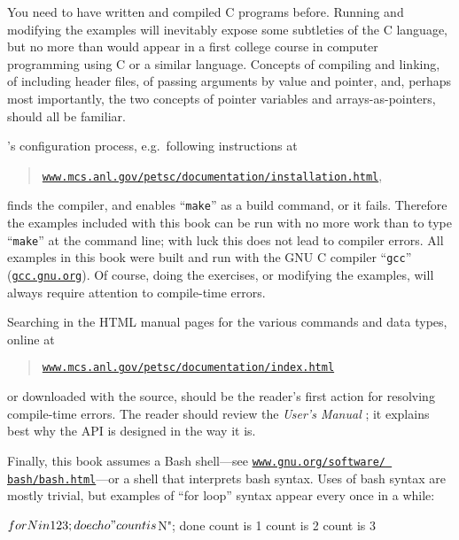 You need to have written and compiled C programs before.   Running and modifying the examples will inevitably expose some subtleties of the C language, but no more than would appear in a first college course in computer programming using C or a similar language.  Concepts of compiling and linking, of including header files, of passing arguments by value and pointer, and, perhaps most importantly, the two concepts of pointer variables and arrays-as-pointers, should all be familiar.

\PETSc's configuration process, e.g.~following instructions at
\begin{quote}
\href{http://www.mcs.anl.gov/petsc/documentation/installation.html}{\texttt{www.mcs.anl.gov/petsc/documentation/installation.html}},
\end{quote}
finds the compiler, and enables ``\texttt{make}'' as a build command, or it fails.  Therefore the examples included with this book can be run with no more work than to type ``\texttt{make}'' at the command line; with luck this does not lead to compiler errors.  All examples in this book were built and run with the GNU C compiler ``\texttt{gcc}'' (\href{https://gcc.gnu.org/}{\texttt{gcc.gnu.org}}).  Of course, doing the exercises, or modifying the examples, will always require attention to compile-time errors.

Searching in the \PETSc HTML manual pages for the various commands and data types, online at
\begin{quote}
\href{http://www.mcs.anl.gov/petsc/documentation/index.html}{\texttt{www.mcs.anl.gov/petsc/documentation/index.html}}
\end{quote}
or downloaded with the \PETSc source, should be the reader's first action for resolving compile-time errors.  The reader should review the \emph{\PETSc User's Manual} \citep{petsc-user-ref}; it explains best why the API is designed in the way it is.

Finally, this book assumes a Bash shell---see  \href{https://www.gnu.org/software/bash/bash.html}{\texttt{www.gnu.org/software/ bash/bash.html}}---or a shell that interprets bash syntax.  Uses of bash syntax are mostly trivial, but examples of ``for loop'' syntax appear every once in a while:
\begin{cline}
$ for N in 1 2 3; do echo "count is $N"; done
count is 1
count is 2
count is 3
\end{cline}
